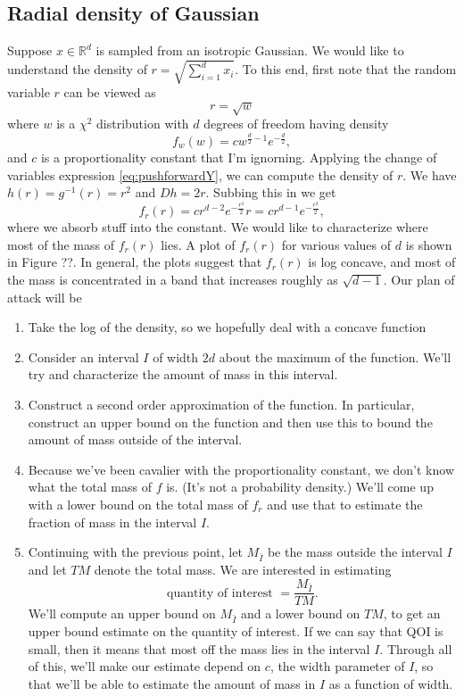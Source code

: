\documentclass{book}
\newcommand{\R}{\mathbb{R}}
\begin{document}
\subsection{Radial density of Gaussian}
Suppose $x\in \R^d$ is sampled from an isotropic Gaussian. We would like to understand the density of $r= \sqrt{\sum_{i=1}^d x_i}$. To this end, first note that the random variable $r$ can be viewed as 
$$
r = \sqrt{w} 
$$
where $w$ is a $\chi^2$ distribution with $d$ degrees of freedom having density
$$
f_w(w) = cw^{\frac{d}{2} - 1}e^{-\frac{d}{2}},
$$
and $c$ is a proportionality constant that I'm ignorning.
Applying the change of variables expression \eqref{eq:pushforwardY}, we can compute the density of $r$. We have $h(r) = g^{-1}(r) = r^2$ and $Dh = 2r$. Subbing this in we get
$$
f_r(r) = cr^{d - 2}e^{-\frac{r^2}{2}}r = cr^{d-1}e^{-\frac{r^2}{2}}, 
$$
where we absorb stuff into the constant. 
We would like to characterize where most of the mass of $f_r(r)$ lies. A plot of $f_r(r)$ for various values of $d$ is shown in Figure ??. In general, the plots suggest that $f_r(r)$ is log concave, and most of the mass is concentrated in a band that increases roughly as $\sqrt{d-1}$. Our plan of attack will be 
\begin{enumerate}
 \item Take the log of the density, so we hopefully deal with a concave function
 \item Consider an interval $I$ of width $2d$ about the maximum of the function. We'll try and characterize the amount of mass in this interval. 
 \item Construct a second order approximation of the function. In particular, construct an upper bound on the function and then use this to bound the amount of mass outside of the interval. 
 \item Because we've been cavalier with the proportionality constant, we don't know what the total mass of $f$ is. (It's not a probability density.) We'll come up with a lower bound on the total mass of $f_r$ and use that to estimate the fraction of mass in the interval $I$. 
 \item Continuing with the previous point, let $M_{\bar I}$ be the mass outside the interval $I$ and let $TM$ denote the total mass. We are interested in estimating
 $$
 \mbox{quantity of interest } = \frac{M_{\bar I}}{TM}.
 $$
We'll compute an upper bound on $M_{\bar I}$ and a lower bound on $TM$, to get an upper bound estimate on the quantity of interest. If we can say that QOI is small, then it means that most off the mass lies in the interval $I$. Through all of this, we'll make our estimate depend on $c$, the width parameter of $I$, so that we'll be able to estimate the amount of mass in $I$ as a function of width. 
\end{enumerate}
\end{document}
